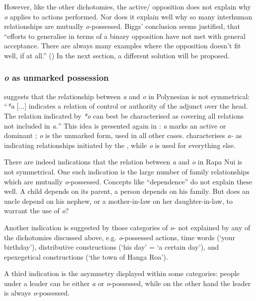 However, like the other dichotomies, the active/ opposition does not explain why \textit{o}  applies to actions performed. Nor does it explain well why so many interhuman relationships are mutually \textit{o-}possessed. Biggs’ conclusion seems justified, that “efforts to generalise in terms of a binary opposition have not met with general acceptance. There are always many examples where the opposition doesn’t fit well, if at all.” (\citealt{Biggs2000}) In the next section, a different solution will be proposed.

\subsubsection[o as unmarked \isi{possession}]{\textit{o} as unmarked possession}\label{sec:6.3.4.3}

\citet[44]{Clark1976} suggests that the relationship between \textit{a} and \textit{o} in Polynesian is not symmetrical: “\textit{*a} [...] indicates a relation of control or authority of the adjunct over the head. The relation indicated by \textit{*o} can best be characterised as covering all relations not included in \textit{a.}” This idea is presented again in \citet{Biggs2000}: \textit{a} marks an active or dominant ; \textit{o} is the unmarked form, used in all other cases. \citet[16]{Wilson1982} characterises \textit{a-} as indicating relationships initiated by the , while \textit{o} is used for everything else.

There are indeed indications that the relation between \textit{a} and \textit{o} in Rapa Nui is not symmetrical. One such indication is the large number of family relationships which are mutually \textit{o}{}-possessed. Concepts like “dependence” do not explain these well. A child depends on its parent, a person depends on his family. But does an uncle depend on his nephew, or a mother-in-law on her daughter-in-law, to warrant the use of \textit{o}? 

Another indication is suggested by those categories of \textit{o}{}- not explained by any of the dichotomies discussed above, e.g. \textit{o}{}-possessed actions, time words (‘your birthday’), distributive constructions (‘his day’ = ‘a certain day’), and epexegetical constructions (‘the town of Hanga Roa’). 

A third indication is the asymmetry displayed within some categories: people under a leader can be either \textit{{\ꞌ}a} or \textit{o}{}-possessed, while on the other hand the leader is always \textit{o}{}-possessed.

